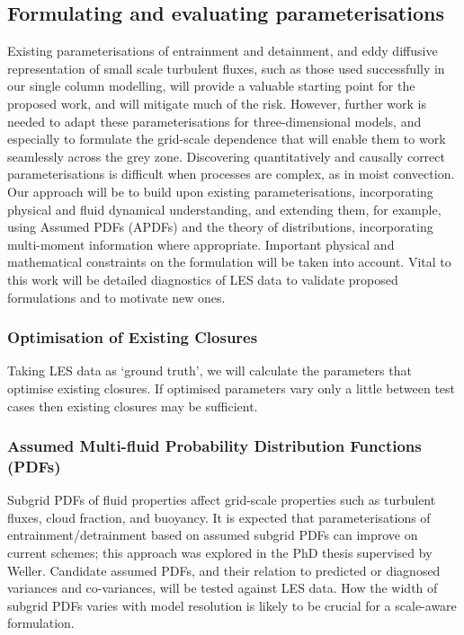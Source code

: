 \documentclass[11pt,a4paper]{article}
\begin{document}
\subsection{Formulating and evaluating parameterisations}
\label{sec:tools}

Existing parameterisations of entrainment and detainment, and eddy diffusive representation of small scale turbulent fluxes, such as those used successfully in our single column modelling, will provide a valuable starting point for the proposed work, and will mitigate much of the risk. However, further work is needed to adapt these parameterisations for three-dimensional models, and especially to formulate the grid-scale dependence that will enable them to work seamlessly across the grey zone. Discovering quantitatively and causally correct parameterisations is difficult when processes are complex, as in moist convection. Our approach will be to build upon existing parameterisations, incorporating physical and fluid
dynamical understanding, and extending them, for example, using Assumed PDFs (APDFs) and the theory of distributions, incorporating multi-moment information where appropriate. Important physical and mathematical constraints on the formulation will be taken into account. Vital to this work will be detailed diagnostics of LES data to validate proposed formulations and to motivate new ones.

\subsubsection*{Optimisation of Existing Closures}

Taking LES data as `ground truth', we will calculate the parameters that optimise existing closures. If optimised parameters vary only a little between test cases then existing closures may be sufficient.

\subsubsection*{Assumed Multi-fluid Probability Distribution Functions (PDFs)}

Subgrid PDFs of fluid properties affect grid-scale properties such as turbulent fluxes, cloud fraction, and buoyancy. It is expected that parameterisations of entrainment/detrainment based on assumed subgrid PDFs can improve on current schemes; this approach was explored in the PhD thesis \cite{McIn20} supervised by Weller. Candidate assumed PDFs, and their relation to predicted or diagnosed variances and co-variances, will be tested against LES data.
How the width of subgrid PDFs varies with model resolution is likely to be crucial for a scale-aware formulation.
\end{document}
